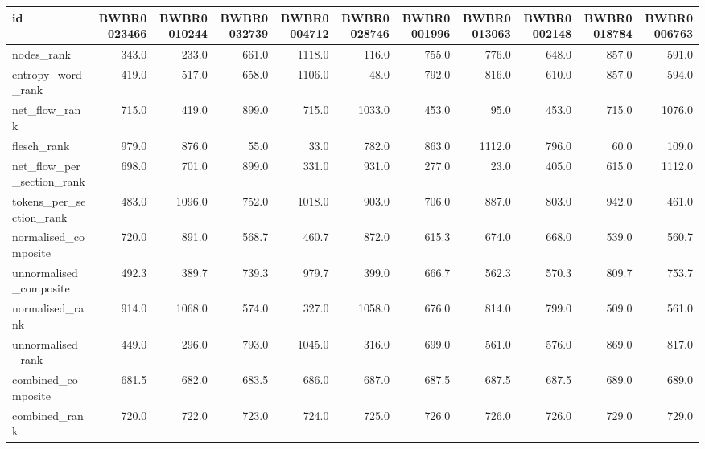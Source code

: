 \begin{tabular}{lrrrrrrrrrr}
\toprule
id & BWBR0023466 & BWBR0010244 & BWBR0032739 & BWBR0004712 & BWBR0028746 & BWBR0001996 & BWBR0013063 & BWBR0002148 & BWBR0018784 & BWBR0006763 \\
\midrule
nodes\_rank & 343.0 & 233.0 & 661.0 & 1118.0 & 116.0 & 755.0 & 776.0 & 648.0 & 857.0 & 591.0 \\
\cline{1-11}
entropy\_word\_rank & 419.0 & 517.0 & 658.0 & 1106.0 & 48.0 & 792.0 & 816.0 & 610.0 & 857.0 & 594.0 \\
\cline{1-11}
net\_flow\_rank & 715.0 & 419.0 & 899.0 & 715.0 & 1033.0 & 453.0 & 95.0 & 453.0 & 715.0 & 1076.0 \\
\cline{1-11}
flesch\_rank & 979.0 & 876.0 & 55.0 & 33.0 & 782.0 & 863.0 & 1112.0 & 796.0 & 60.0 & 109.0 \\
\cline{1-11}
net\_flow\_per\_section\_rank & 698.0 & 701.0 & 899.0 & 331.0 & 931.0 & 277.0 & 23.0 & 405.0 & 615.0 & 1112.0 \\
\cline{1-11}
tokens\_per\_section\_rank & 483.0 & 1096.0 & 752.0 & 1018.0 & 903.0 & 706.0 & 887.0 & 803.0 & 942.0 & 461.0 \\
\cline{1-11}
normalised\_composite & 720.0 & 891.0 & 568.7 & 460.7 & 872.0 & 615.3 & 674.0 & 668.0 & 539.0 & 560.7 \\
\cline{1-11}
unnormalised\_composite & 492.3 & 389.7 & 739.3 & 979.7 & 399.0 & 666.7 & 562.3 & 570.3 & 809.7 & 753.7 \\
\cline{1-11}
normalised\_rank & 914.0 & 1068.0 & 574.0 & 327.0 & 1058.0 & 676.0 & 814.0 & 799.0 & 509.0 & 561.0 \\
\cline{1-11}
unnormalised\_rank & 449.0 & 296.0 & 793.0 & 1045.0 & 316.0 & 699.0 & 561.0 & 576.0 & 869.0 & 817.0 \\
\cline{1-11}
combined\_composite & 681.5 & 682.0 & 683.5 & 686.0 & 687.0 & 687.5 & 687.5 & 687.5 & 689.0 & 689.0 \\
\cline{1-11}
combined\_rank & 720.0 & 722.0 & 723.0 & 724.0 & 725.0 & 726.0 & 726.0 & 726.0 & 729.0 & 729.0 \\
\cline{1-11}
\bottomrule
\end{tabular}

